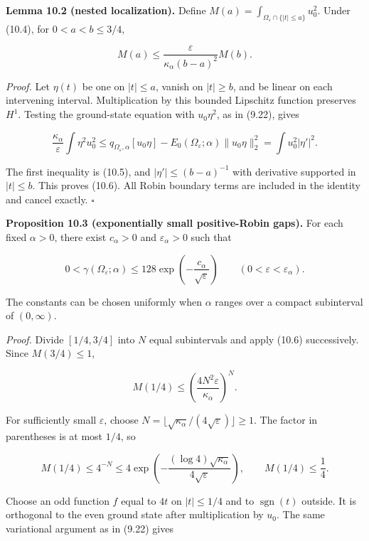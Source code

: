 \documentclass[11pt]{article}
\begin{document}
\textbf{Lemma 10.2 (nested localization).} Define
\(M(a)=\int_{\Omega_\varepsilon\cap\{|t|\le a\}}u_0^2\). Under (10.4),
for \(0<a<b\le3/4\),

\[
M(a)\le\frac{\varepsilon}{\kappa_\alpha(b-a)^2}M(b).
\tag{10.6}
\]

\emph{Proof.} Let \(\eta(t)\) be one on \(|t|\le a\), vanish on
\(|t|\ge b\), and be linear on each intervening interval. Multiplication
by this bounded Lipschitz function preserves \(H^1\). Testing the
ground-state equation with \(u_0\eta^2\), as in (9.22), gives

\[
\frac{\kappa_\alpha}{\varepsilon}\int\eta^2u_0^2
\le q_{\Omega_\varepsilon,\alpha}[u_0\eta]
-E_0(\Omega_\varepsilon;\alpha)\|u_0\eta\|_2^2
=\int u_0^2|\eta'|^2.
\tag{10.7}
\]

The first inequality is (10.5), and \(|\eta'|\le(b-a)^{-1}\) with
derivative supported in \(|t|\le b\). This proves (10.6). All Robin
boundary terms are included in the identity and cancel exactly. \(\square\)

\textbf{Proposition 10.3 (exponentially small positive-Robin gaps).} For
each fixed \(\alpha>0\), there exist \(c_\alpha>0\) and
\(\varepsilon_\alpha>0\) such that

\[
0<\gamma(\Omega_\varepsilon;\alpha)
\le128\exp\left(-\frac{c_\alpha}{\sqrt\varepsilon}\right)
\qquad(0<\varepsilon<\varepsilon_\alpha).
\tag{10.8}
\]

The constants can be chosen uniformly when \(\alpha\) ranges over a
compact subinterval of \((0,\infty)\).

\emph{Proof.} Divide \([1/4,3/4]\) into \(N\) equal subintervals and
apply (10.6) successively. Since \(M(3/4)\le1\),

\[
M(1/4)\le\left(\frac{4N^2\varepsilon}{\kappa_\alpha}\right)^N.
\tag{10.9}
\]

For sufficiently small \(\varepsilon\), choose
\(N=\lfloor\sqrt{\kappa_\alpha}/(4\sqrt\varepsilon)\rfloor\ge1\). The
factor in parentheses is at most \(1/4\), so

\[
M(1/4)\le4^{-N}
\le4\exp\left(-\frac{(\log4)\sqrt{\kappa_\alpha}}
 {4\sqrt\varepsilon}\right),
\qquad M(1/4)\le\frac14.
\tag{10.10}
\]

Choose an odd function \(f\) equal to \(4t\) on \(|t|\le1/4\) and to
\(\operatorname{sgn}(t)\) outside. It is orthogonal to the even ground
state after multiplication by \(u_0\). The same variational argument as
in (9.22) gives
\end{document}
